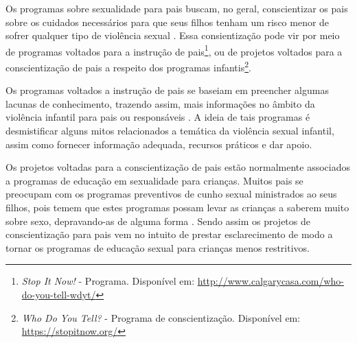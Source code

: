 
Os programas sobre sexualidade para pais buscam, no geral, conscientizar os pais sobre os cuidados necessários para que seus filhos tenham um risco menor de sofrer qualquer tipo de violência sexual \cite{pelisoli2010prevenccao}. Essa consientização pode vir por meio de programas voltados para a instrução de pais\footnote{\textit{\label{note:nota2}Stop It Now!} - Programa. Disponível em: \url{http://www.calgarycasa.com/who-do-you-tell-wdyt/}}, ou de projetos voltados para a conscientização de pais a respeito dos programas infantis\footnote{\textit{\label{note:nota3}Who Do You Tell?} - Programa de conscientização. Disponível em: \url{https://stopitnow.org/}}. 

Os programas voltados a instrução de pais se baseiam em preencher algumas lacunas de conhecimento, trazendo assim, mais informações no âmbito da violência infantil para pais ou responsáveis \cite{maria2010papel}. A ideia de tais programas é desmistificar alguns mitos relacionados a temática da violência sexual infantil, assim como fornecer informação adequada, recursos práticos e dar apoio.

Os projetos voltadas para a conscientização de pais estão normalmente associados a programas de educação em sexualidade para crianças. Muitos pais se preocupam com os programas preventivos de cunho sexual ministrados ao seus filhos, pois temem que estes programas possam levar as crianças a saberem muito sobre sexo, depravando-as de alguma forma \cite{chen2007prevention}. Sendo assim os projetos de conscientização para pais vem no intuito de prestar esclarecimento de modo a tornar os programas de educação sexual para crianças menos restritivos. 

